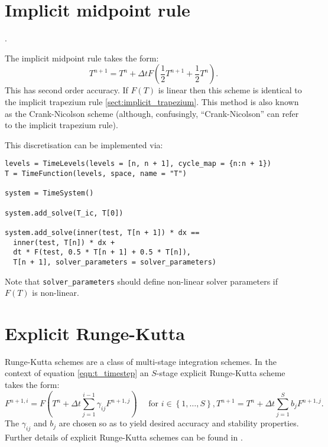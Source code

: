 \documentclass[a4paper]{book}
\begin{document}
\section{Implicit midpoint rule}\label{sect:implicit_midpoint}.

The implicit midpoint rule takes the form:
\begin{equation}
  T^{n + 1} = T^n + \Delta t F \left( \frac{1}{2} T^{n + 1} + \frac{1}{2} T^n \right).
\end{equation}
This has second order accuracy. If $F(T)$ is linear then this scheme is
identical to the implicit trapezium rule \ref{sect:implicit_trapezium}. This
method is also known as the Crank-Nicolson scheme
\citep[e.g.][section 2.22]{mitchell1980} (although, confusingly,
``Crank-Nicolson'' can refer to the implicit trapezium rule).

This discretisation can be implemented via:
\begin{lstlisting}
levels = TimeLevels(levels = [n, n + 1], cycle_map = {n:n + 1})
T = TimeFunction(levels, space, name = "T")

system = TimeSystem()

system.add_solve(T_ic, T[0])

system.add_solve(inner(test, T[n + 1]) * dx ==
  inner(test, T[n]) * dx +
  dt * F(test, 0.5 * T[n + 1] + 0.5 * T[n]),
  T[n + 1], solver_parameters = solver_parameters)
\end{lstlisting}
Note that \verb+solver_parameters+ should define non-linear solver parameters if
$F(T)$ is non-linear.

\section{Explicit Runge-Kutta}

Runge-Kutta schemes are a class of multi-stage integration schemes. In the
context of equation \eqref{eqn:t_timestep} an $S$-stage explicit Runge-Kutta
scheme takes the form:
\begin{subequations}
  \begin{equation}
    F^{n + 1,i} = F \left( T^n + \Delta t \sum_{j = 1}^{i - 1} \gamma_{ij} F^{n + 1,j} \right) \quad \textrm{ for } i \in \left\{ 1, \ldots, S \right\},
  \end{equation}
  \begin{equation}
    T^{n + 1} = T^n + \Delta t \sum_{j = 1}^S b_j F^{n + 1,j}.
  \end{equation}
\end{subequations}
The $\gamma_{ij}$ and $b_j$ are chosen so as to yield desired accuracy and
stability properties. Further details of explicit Runge-Kutta schemes can be
found in \citet[section 3.2]{iserles2009}.
\end{document}
